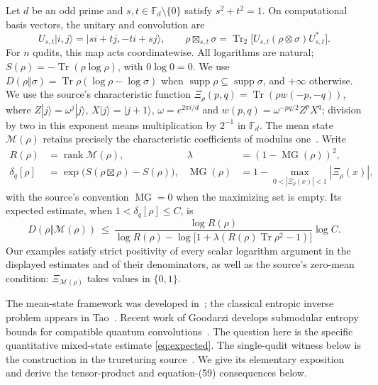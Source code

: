 \documentclass[10pt]{article}
\newcommand{\Tr}{\operatorname{Tr}}
\newcommand{\MS}{\mathcal M}
\begin{document}
Let $d$ be an odd prime and $s,t\in\mathbb F_d\setminus\{0\}$ satisfy
$s^2+t^2=1$. On computational basis vectors, the unitary and convolution are
\begin{equation}\label{eq:conv}
 U_{s,t}|i,j\rangle=|si+tj,-ti+sj\rangle,\qquad
 \rho\boxtimes_{s,t}\sigma=\Tr_2\bigl[U_{s,t}(\rho\otimes\sigma)U_{s,t}^*\bigr].
\end{equation}
For $n$ qudits, this map acts coordinatewise. All logarithms are natural;
$S(\rho)=-\Tr(\rho\log\rho)$, with $0\log0=0$.
We use $D(\rho\Vert\sigma)=\Tr\rho(\log\rho-\log\sigma)$ when
$\operatorname{supp}\rho\subseteq\operatorname{supp}\sigma$, and $+\infty$
otherwise.
We use the source's characteristic function
$\Xi_\rho(p,q)=\Tr(\rho w(-p,-q))$, where
$Z|j\rangle=\omega^j|j\rangle$, $X|j\rangle=|j+1\rangle$,
$\omega=e^{2\pi i/d}$ and
$w(p,q)=\omega^{-pq/2}Z^pX^q$; division by two in this exponent means
multiplication by $2^{-1}$ in $\mathbb F_d$.
The mean state $\MS(\rho)$ retains precisely the characteristic coefficients
of modulus one~\cite[Definitions~6--8 and 10]{BGJ}. Write
\begin{align*}
 R(\rho)&=\operatorname{rank}\MS(\rho),&
 \lambda&=(1-\operatorname{MG}(\rho))^2,\\
 \delta_q[\rho]&=\exp\bigl(S(\rho\boxtimes\rho)-S(\rho)\bigr),&
 \operatorname{MG}(\rho)&=1-\max_{0<|\Xi_\rho(x)|<1}|\Xi_\rho(x)|,
\end{align*}
with the source's convention $\operatorname{MG}=0$ when the maximizing set is
empty. Its expected estimate, when $1<\delta_q[\rho]\le C$, is
\begin{equation}\label{eq:expected}
 D(\rho\Vert\MS(\rho))\ \le\
 \frac{\log R(\rho)}{\log R(\rho)-\log\bigl[1+\lambda
 (R(\rho)\Tr\rho^2-1)\bigr]}\log C.
 \tag{BGJ 58}
\end{equation}
Our examples satisfy strict positivity of every scalar logarithm argument in
the displayed estimates and of their denominators, as well as the source's
zero-mean condition: $\Xi_{\MS(\rho)}$ takes values in $\{0,1\}$.

The mean-state framework was developed in~\cite{PNAS,DQG}; the classical entropic
inverse problem appears in Tao~\cite{Tao}. Recent work of Goodarzi develops
submodular entropy bounds for compatible quantum convolutions~\cite[Theorem~4.1]{Goodarzi}.
The question here is the specific quantitative mixed-state estimate
\eqref{eq:expected}. The single-qudit witness below is the construction in the
trureturing source~\cite{Source}. We give its elementary exposition and derive
the tensor-product and equation-(59) consequences below.
\end{document}
